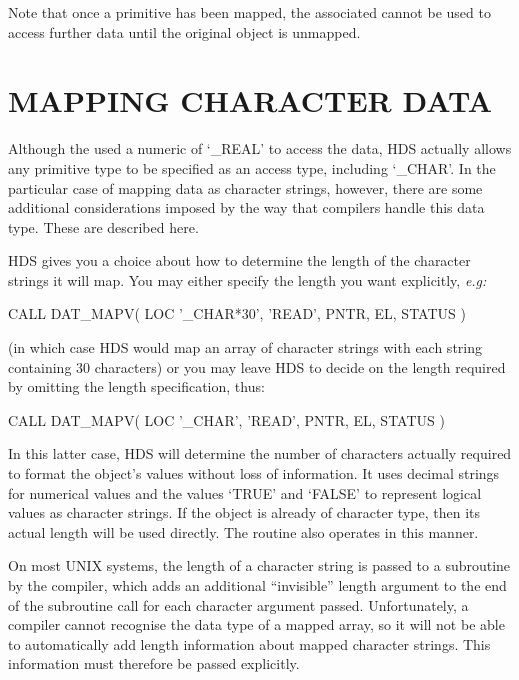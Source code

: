\documentclass[twoside,11pt]{starlink}
\providecommand{\qt}[1]{``#1''}
\providecommand{\st}[1]{{\emph{#1}}}
\begin{document}
Note that once a primitive has been mapped, the associated
 cannot be used to access further data
until the original object is unmapped.

\section{\label{sect:charmapping}MAPPING CHARACTER DATA}

Although the  used a
numeric  of `\_REAL' to access the data, HDS
actually allows any primitive type to be specified as an access type,
including `\_CHAR'. In the particular case of mapping data as
character strings, however, there are some additional considerations
imposed by the way that compilers handle this data type. These are
described here.

HDS gives you a choice about how to determine the length of the
character strings it will map. You may either specify the length you
want explicitly, \st{e.g:}

\begin{small}
\begin{terminalv}
CALL DAT_MAPV( LOC '_CHAR*30', 'READ', PNTR, EL, STATUS )
\end{terminalv}
\end{small}

(in which case HDS would map an array of character strings with each
string containing 30 characters) or you may leave HDS to decide on the
length required by omitting the length specification, thus:

\small
\begin{small}
\begin{terminalv}
CALL DAT_MAPV( LOC '_CHAR', 'READ', PNTR, EL, STATUS )
\end{terminalv}
\end{small}

In this latter case, HDS will determine the number of characters
actually required to format the object's values without loss of
information. It uses decimal strings for numerical values and the
values `TRUE' and `FALSE' to represent logical values as character
strings. If the object is already of character type, then its actual
length will be used directly. The routine
 also operates in this manner.

On most UNIX systems, the length of a character string is passed to a
subroutine by the compiler, which adds an additional \qt{invisible}
length argument to the end of the subroutine call for each character
argument passed. Unfortunately, a compiler cannot recognise the data
type of a mapped array, so it will not be able to automatically add
length information about mapped character strings. This information
must therefore be passed explicitly.
\end{document}
